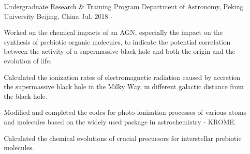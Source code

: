 


\begin{cventries}


\cventry
{Undergraduate Research \& Training Program} %
{Department of Astronomy, Peking University} %
{Beijing, China} %
{Jul. 2018 - } %
{ %
\begin{cvitems}
\item {Worked on the chemical impacts of an AGN, especially the impact on the synthesis of prebiotic organic molecules, to indicate the potential correlation between the activity of a supermassive black hole and both the origin and the evolution of life.}
\item {Calculated the ionization rates of electromagnetic radiation caused by accretion the supermassive black hole in the Milky Way, in different galactic distance from the black hole.}
\item {Modified and completed the codes for photo-ionization processes of various atoms and molecules based on the widely used package in astrochemistry - KROME.}
\item {Calculated the chemical evolutions of crucial precursors for interstellar prebiotic molecules.}
\end{cvitems}
}

\end{cventries}